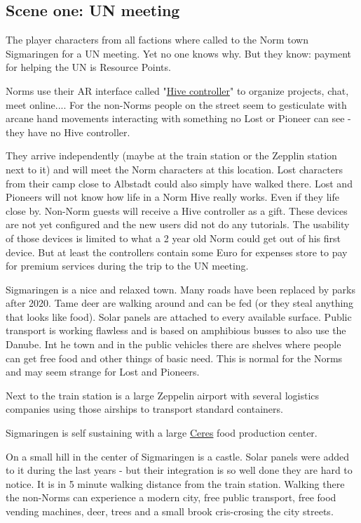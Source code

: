 \subsection{Scene one: UN meeting}

The player characters from all factions where called to the Norm town Sigmaringen for a UN meeting. Yet no one knows why. But they know: payment for helping the UN is Resource Points.

Norms use their AR interface called "\hyperref[sec:Hive controller]{Hive controller}" to organize projects, chat, meet online.... For the non-Norms people on the street seem to gesticulate with arcane hand movements interacting with something no Lost or Pioneer can see - they have no Hive controller.

They arrive independently (maybe at the train station or the Zepplin station next to it) and will meet the Norm characters at this location. Lost characters from their camp close to Albstadt could also simply have walked there. Lost and Pioneers will not know how life in a Norm Hive really works. Even if they life close by.
Non-Norm guests will receive a Hive controller as a gift. These devices are not yet configured and the new users did not do any tutorials. The usability of those devices is limited to what a 2 year old Norm could get out of his first device. But at least the controllers contain some Euro for expenses store to pay for premium services during the trip to the UN meeting.

Sigmaringen is a nice and relaxed town. Many roads have been replaced by parks after 2020. Tame deer are walking around and can be fed (or they steal anything that looks like food). Solar panels are attached to every available surface. Public transport is working flawless and is based on amphibious busses to also use the Danube. Int he town and in the public vehicles there are shelves where people can get free food and other things of basic need. This is normal for the Norms and may seem strange for Lost and Pioneers.

Next to the train station is a large Zeppelin airport with several logistics companies using those airships to transport standard containers.

Sigmaringen is self sustaining with a large \hyperref[sec:norm food]{Ceres} food production center.

On a small hill in the center of Sigmaringen is a castle. Solar panels were added to it during the last years - but their integration is so well done they are hard to notice. It is in 5 minute walking distance from the train station. Walking there the non-Norms can experience a modern city, free public transport, free food vending machines, deer, trees and a small brook cris-crosing the city streets.

